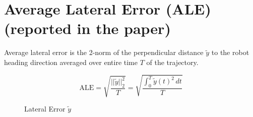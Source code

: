 \section{Average Lateral Error (ALE) (reported in the paper)}
Average lateral error is the 2-norm of the perpendicular distance $\tilde{y}$
to the robot heading direction averaged over entire time $T$ of the trajectory. 
\begin{figure}[h]
  \begin{minipage}{0.5\textwidth}
  \begin{equation} \label{eq:ale}
    \text{ALE} = \sqrt{\frac{||\tilde{y}||_2^2}{T}} 
    = \sqrt{\frac{\int_{0}^{T} \tilde{y}(t)^2 \,dt}{T}}
  \end{equation}
  \end{minipage}
  \hfill
  \begin{minipage}{0.49\textwidth}
    \vspace*{0.06in}
    \centering
    \vspace*{-7pt}
    \caption{Lateral Error $\tilde{y}$ \label{fig:ale}}
  \end{minipage}  
  \vspace*{-1.5em}
\end{figure}

